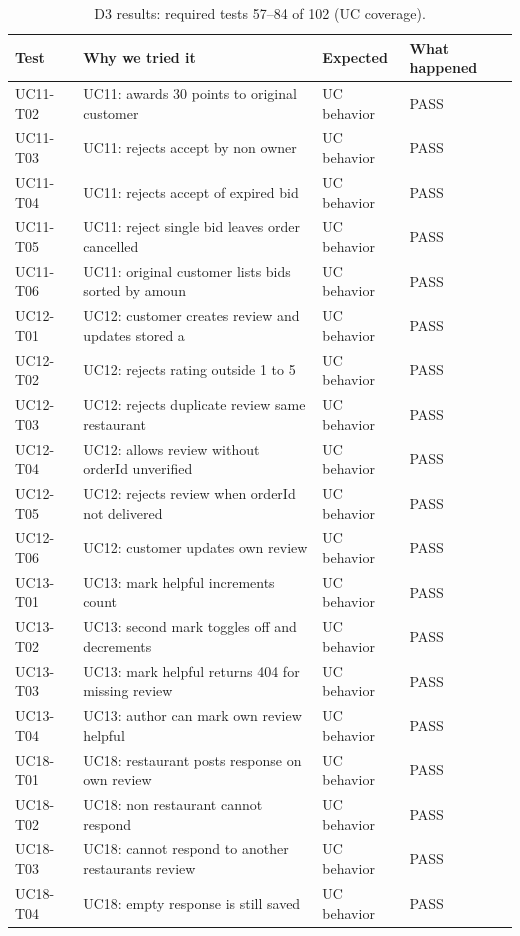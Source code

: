 \begin{table}[t]
\caption{D3 results: required tests 57--84 of 102 (UC coverage).}
\label{tab:d3r3}
\centering\scriptsize
\begin{tabular}{p{3.8cm}p{3.6cm}p{2.8cm}p{2.0cm}}
\toprule
Test & Why we tried it & Expected & What happened \\
\midrule
UC11-T02 & UC11: awards 30 points to original customer & UC behavior & PASS \\
UC11-T03 & UC11: rejects accept by non owner & UC behavior & PASS \\
UC11-T04 & UC11: rejects accept of expired bid & UC behavior & PASS \\
UC11-T05 & UC11: reject single bid leaves order cancelled & UC behavior & PASS \\
UC11-T06 & UC11: original customer lists bids sorted by amoun & UC behavior & PASS \\
UC12-T01 & UC12: customer creates review and updates stored a & UC behavior & PASS \\
UC12-T02 & UC12: rejects rating outside 1 to 5 & UC behavior & PASS \\
UC12-T03 & UC12: rejects duplicate review same restaurant & UC behavior & PASS \\
UC12-T04 & UC12: allows review without orderId unverified & UC behavior & PASS \\
UC12-T05 & UC12: rejects review when orderId not delivered & UC behavior & PASS \\
UC12-T06 & UC12: customer updates own review & UC behavior & PASS \\
UC13-T01 & UC13: mark helpful increments count & UC behavior & PASS \\
UC13-T02 & UC13: second mark toggles off and decrements & UC behavior & PASS \\
UC13-T03 & UC13: mark helpful returns 404 for missing review & UC behavior & PASS \\
UC13-T04 & UC13: author can mark own review helpful & UC behavior & PASS \\
UC18-T01 & UC18: restaurant posts response on own review & UC behavior & PASS \\
UC18-T02 & UC18: non restaurant cannot respond & UC behavior & PASS \\
UC18-T03 & UC18: cannot respond to another restaurants review & UC behavior & PASS \\
UC18-T04 & UC18: empty response is still saved & UC behavior & PASS \\

\end{tabular}
\end{table}
